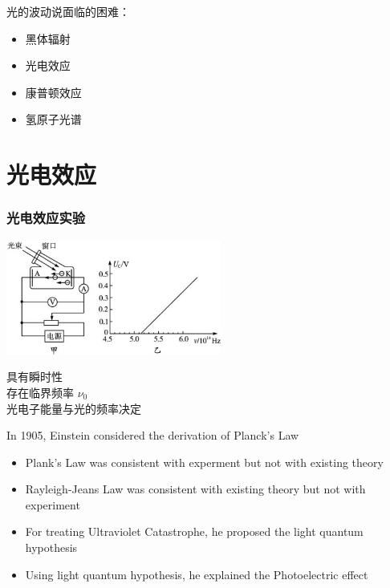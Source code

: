 \begin{frame} 
    光的波动说面临的困难：
    \begin{itemize}
        \item 黑体辐射
        \item 光电效应
        \item 康普顿效应
        \item 氢原子光谱
    \end{itemize}
\end{frame}

\section{光电效应}
\begin{frame} 
    \frametitle{光电效应实验}   
    \begin{center}
       \includegraphics[width=0.53\textwidth]{figs/2021-12-02-16-01-21.png}
   \end{center}  
   \bullet 具有瞬时性 \\
   \bullet 存在临界频率 $\nu_0$ \\
   \bullet 光电子能量与光的频率决定
\end{frame}  

\begin{frame} 
    In 1905, Einstein considered the derivation of Planck's Law  \\
    \begin{itemize}
        \item Plank’s Law was consistent with experment but not with existing theory
        \item Rayleigh-Jeans Law was consistent with existing theory but not with experiment
        \item For treating Ultraviolet Catastrophe, he proposed the light quantum hypothesis
        \item Using light quantum hypothesis, he explained the Photoelectric effect
    \end{itemize}
\end{frame}

